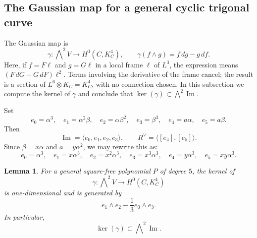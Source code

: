 \documentclass[11pt]{article}
\newtheorem{lemma}[theorem]{Lemma}
\begin{document}
\subsection{The Gaussian map for a general cyclic trigonal curve}
\label{subsec:gaussian-general-cyclic}

The Gaussian map is
\begin{equation}
\label{old:eq:gaussian-map}
\gamma:
\bigwedge\nolimits^2V
\longrightarrow
H^0(C,K_C^4),
\qquad
\gamma(f\wedge g)=f\,dg-g\,df.
\end{equation}
{Here, if $f=F\ell$ and $g=G\ell$ in a local frame $\ell$ of $L^3$,
the expression means $(F\,dG-G\,dF)\ell^2$. Terms involving the
derivative of the frame cancel; the result is a section of
$L^6\otimes K_C=K_C^4$, with no connection chosen.}
In this subsection we compute the kernel of $\gamma$ and conclude that
$\ker(\gamma)\subset\bigwedge\nolimits^2\operatorname{Im}.$


Set
\begin{equation*}
e_0=\alpha^3,
\quad
e_1=\alpha^2\beta,
\quad
e_2=\alpha\beta^2,
\quad
e_3=\beta^3,
\quad
e_4=a\alpha,
\quad
e_5=a\beta.
\end{equation*}
Then
\begin{equation*}
\operatorname{Im}=\langle e_0,e_1,e_2,e_3\rangle,
\qquad
R^\vee=\langle[e_4],[e_5]\rangle.
\end{equation*}
Since $\beta=x\alpha$ and $a=y\alpha^2$, we may rewrite this as:
\begin{equation*}
e_0=\alpha^3,
\quad
e_1=x\alpha^3,
\quad
e_2=x^2\alpha^3,
\quad
e_3=x^3\alpha^3,
\quad
e_4=y\alpha^3,
\quad
e_5=xy\alpha^3.
\end{equation*}

\begin{lemma}
\label{lem:gaussian-kernel-cyclic}
For a general square-free polynomial $P$ of degree $5$, the kernel of
\begin{equation*}
\gamma:\bigwedge\nolimits^2V\longrightarrow H^0(C,K_C^4)
\end{equation*}
is one-dimensional and is generated by
\begin{equation}
\label{eq:gaussian-kernel-generator}
e_1\wedge e_2-\frac13e_0\wedge e_3.
\end{equation}
In particular,
\begin{equation*}
\ker(\gamma)\subset\bigwedge\nolimits^2\operatorname{Im}.
\end{equation*}
\end{lemma}
\end{document}
